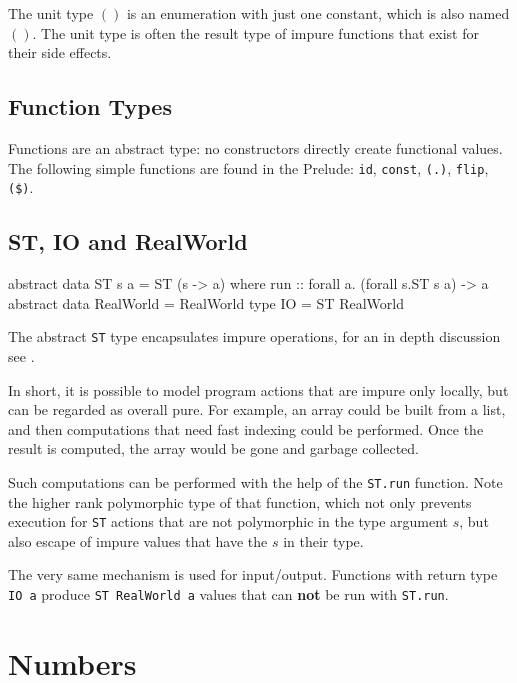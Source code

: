 The unit type $()$ is an enumeration with just one constant, which is also named $()$. 
The unit type is often the result type of impure functions that exist for their side effects.


\subsection{Function Types}

Functions are an abstract type: no constructors directly create functional values.
The following simple functions are found in the Prelude: \texttt{id}, \texttt{const}, \texttt{(.)}, \texttt{flip}, \texttt{(\$)}.

\subsection{ST, IO and RealWorld}

\begin{code}
abstract data ST s a = ST (s -> a)
    where  run :: forall a. (forall s.ST s a) -> a
abstract data RealWorld = RealWorld
type IO = ST RealWorld 
\end{code}

The abstract \texttt{ST} type encapsulates impure operations, for an in depth discussion see \cite{lazyst}.

In short, it is possible to model program actions that are impure only locally, but can be regarded as overall pure. For example, an array could be built from a list, and then computations  that need fast indexing could be performed. Once the result is computed, the array would be gone and garbage collected.

Such computations can be performed with the help of the \texttt{ST.run} function. Note the higher rank polymorphic type of that function, which not only prevents execution for \texttt{ST} actions that are not polymorphic in the type argument $s$, but also escape of impure values that have the $s$ in their type.

The very same mechanism is used for input/output. Functions with return type \texttt{IO a} produce \texttt{ST RealWorld a} values that can \textbf{not} be run with \texttt{ST.run}.

\section{Numbers} \label{numeric} 

